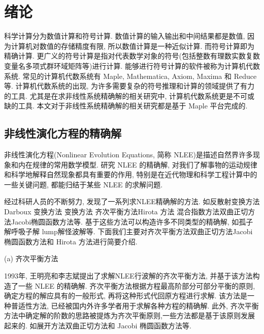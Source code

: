 \chapter{绪论} \label{ch01}
科学计算分为数值计算和符号计算. 数值计算的输入输出和中间结果都是数值, 因为计算机对数值的存储精度有限, 所以数值计算是一种近似计算. 而符号计算即为精确计算. 更广义的符号计算是指对代表数学对象的符号(包括整数\D 有理数\D 实数\D 复数\D 变量名\D 多项式\D 群\D 环\D 域\D 矩阵等)进行计算. 能够进行符号计算的软件被称为计算机代数系统. 常见的计算机代数系统有 Maple, Mathematica, Axiom, Maxima 和 Reduce 等. 计算机代数系统的出现, 为许多需要复杂的符号推理和计算的领域提供了有力的工具. 尤其是在求非线性系统精确解的相关研究中, 计算机代数系统更是不可或缺的工具. 本文对于非线性系统精确解的相关研究都是基于 Maple 平台完成的. 

\section{非线性演化方程的精确解}
非线性演化方程(Nonlinear Evolution Equations, 简称 NLEE)是描述自然界许多现象和内在规律的常用数学模型. 研究 NLEE 的精确解, 对我们了解事物的运动规律和科学地解释自然现象都具有重要的作用, 特别是在近代物理和科学工程计算中的一些关键问题, 都能归结于某些 NLEE 的求解问题. 

经过科研人员的不断努力, 发现了一系列求NLEE精确解的方法. 如反散射变换方法\cite{kawata1978inverse}\D Darboux 变换方法 \cite{matveev1991darboux}\D \Backlund{}变换方法 \cite{wahlquist1973backlund}\D 齐次平衡方法\cite{zhibin1993travelling}\D Hirota 方法 \cite{hirota1971exact}\D 混合指数方法\cite{hereman1986exact}\D 双曲正切方法\cite{malfliet1992solitary}\D Jacobi椭圆函数方法\cite{liu2001jacobi}等. 基于这些方法可以构造许多不同类型的精确解, 如孤子解\cite{hirota1971exact}\D 呼吸子解 \cite{tajiri1989breather}\D lump解\cite{satsuma1979two}\D 怪波解\cite{guo2011rogue}等. 下面我们主要对齐次平衡方法\D 双曲正切方法\D Jacobi 椭圆函数方法和 Hirota 方法进行简要介绍. 

(a) 齐次平衡方法

1993年, 王明亮和李志斌\cite{zhibin1993travelling}提出了求解NLEE行波解的齐次平衡方法, 并基于该方法构造了一些 NLEE 的精确解\cite{wang1995solitary,wang1996application}. 齐次平衡方法根据方程最高阶部分可部分平衡的原则, 确定方程的解应具有的一般形式, 再将这种形式代回原方程进行求解. 该方法是一种普适性方法, 已经被国内外许多学者用于求解各种方程的精确解\cite{hbm1998,senthilvelan2001extended,zhao2002new,rady2010homogeneous,nguyen2015modified}. 此外, 齐次平衡方法中确定解的阶数的思路被提炼为齐次平衡原则,一些方法都是基于该原则发展起来的. 如\Painleve{}展开方法\D 双曲正切方法和 Jacobi 椭圆函数方法等. 

